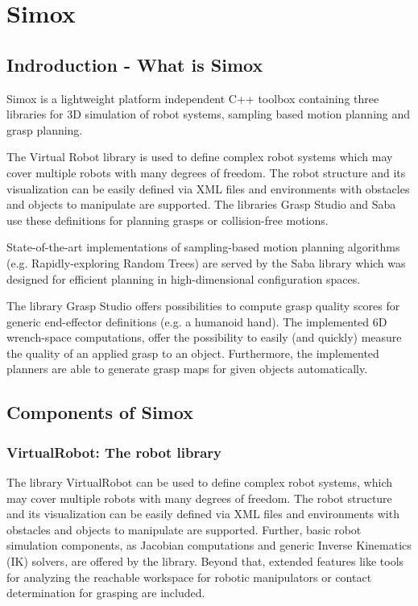 \section{Simox}
\subsection{Indroduction - What is Simox}
Simox is a lightweight platform independent C++ toolbox containing three libraries for 3D simulation of robot systems, sampling based motion planning and grasp planning. \par The Virtual Robot library is used to define complex robot systems which may cover multiple robots with many degrees of freedom. The robot structure and its visualization can be easily defined via XML files and environments with obstacles and objects to manipulate are supported. The libraries Grasp Studio and Saba use these definitions for planning grasps or collision-free motions.\par State-of-the-art implementations of sampling-based motion planning algorithms (e.g. Rapidly-exploring Random Trees) are served by the Saba library which was designed for efficient planning in high-dimensional configuration spaces. \par The library Grasp Studio offers possibilities to compute grasp quality scores for generic end-effector definitions (e.g. a humanoid hand). The implemented 6D wrench-space computations, offer the possibility to easily (and quickly) measure the quality of an applied grasp to an object. Furthermore, the implemented planners are able to generate grasp maps for given objects automatically.
\subsection{Components of Simox}
\subsubsection{VirtualRobot: The robot library}
The library VirtualRobot can be used to define complex robot systems, which may cover multiple robots with many degrees of freedom. The robot structure and its visualization can be easily defined via XML files and environments with obstacles and objects to manipulate are supported. Further, basic robot simulation components, as Jacobian computations and generic Inverse Kinematics (IK) solvers, are offered by the library. Beyond that, extended features like tools for analyzing the reachable workspace for robotic manipulators or contact determination for grasping are included. 
